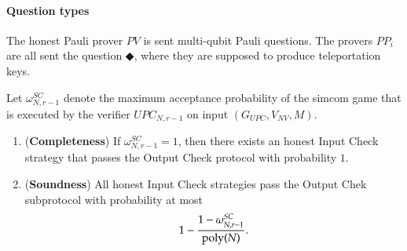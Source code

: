 
\paragraph{Question types} 
The honest Pauli prover $PV$ is sent multi-qubit Pauli questions. The provers $PP_i$ are all sent the question $\Diamondblack$, where they are supposed to produce teleportation keys.

\begin{lemma}	
\label{lem:output_check}
Let $\omega_{N,r-1}^{SC}$ denote the maximum acceptance probability of the simcom game that is executed by the verifier $UPC_{N,r-1}$ on input $(G_{UPC},V_{NV},M)$. 
\begin{enumerate}
	\item (\textbf{Completeness}) If $\omega_{N,r-1}^{SC} = 1$, then there exists an honest Input Check strategy that passes the Output Check protocol with probability $1$.
	
	\item (\textbf{Soundness}) All honest Input Check strategies pass the Output Chek subprotocol with probability at most 
\[
	1 - \frac{1 - \omega_{N,r-1}^{SC}}{\operatorname{poly}(N)}.
\] 
\end{enumerate}
\end{lemma}
